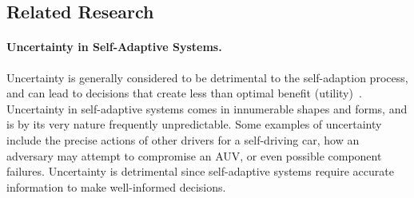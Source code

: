 \documentclass[12pt]{article}
\newcommand{\dan}[1]{\textcolor{blue}{{\it [Dan says: #1]}}}
\begin{document}
\subsection{Related Research} %





\vspace{-0mm}\paragraph{Uncertainty in Self-Adaptive Systems.}
Uncertainty is generally considered to be detrimental to the self-adaption process, and can lead to decisions that create less than optimal benefit (utility)~\cite{calinescu2011dynamic, camara2017reasoning, esfahani2013uncertainty}. Uncertainty in self-adaptive systems comes in innumerable shapes and forms, and is by its very nature frequently unpredictable. Some examples of uncertainty include the precise actions of other drivers for a self-driving car, how an adversary may attempt to compromise an AUV, or even possible component failures. Uncertainty is detrimental since self-adaptive systems require accurate information to make well-informed decisions.

\end{document}

